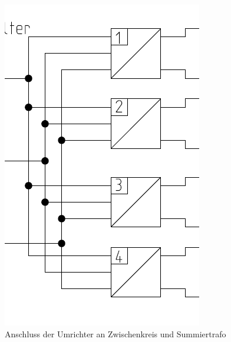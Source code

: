 \begin{figure}[!htb]
\begin{minipage}[b]{0.4\textwidth}
        \includegraphics[width=\textwidth,frame]{Bilder/umrichter_16.png}
      \caption{Anschluss der Umrichter an Zwischenkreis und Summiertrafo}
    \end{minipage}
  \end{figure}
\clearpage


